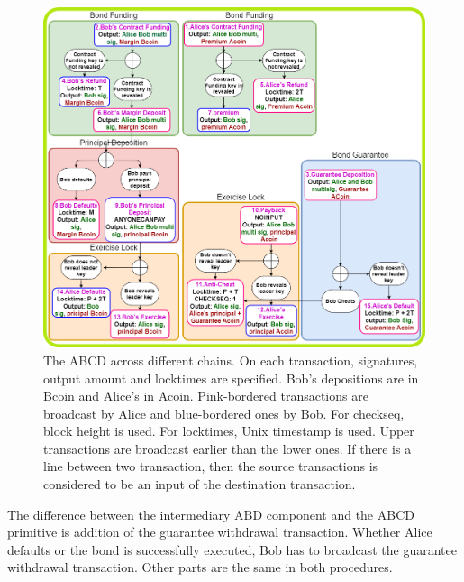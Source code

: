 \begin{figure}[]
  \centering
  \includegraphics[width=\linewidth]{figures/bond-third.png}
  \caption{The ABCD across different chains. On each transaction, signatures, output amount and locktimes are specified. Bob's depositions are in Bcoin and Alice's in Acoin. Pink-bordered transactions are broadcast by Alice and blue-bordered ones by Bob. For checkseq, block height is used. For locktimes, Unix timestamp is used. Upper transactions are broadcast earlier than the lower ones. If there is a line between two transaction, then the source transactions is considered to be an input of the destination transaction.}
  \label{fig:cross-chain-non-collat-bond}
\end{figure}

The difference between the intermediary ABD component and the ABCD primitive is addition of the guarantee withdrawal transaction. Whether Alice defaults or the bond is successfully executed, Bob has to broadcast the guarantee withdrawal transaction. Other parts are the same in both procedures.
